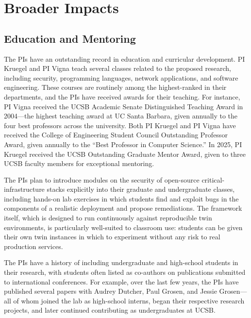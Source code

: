 \section{Broader Impacts}
\label{sec:broader}

\subsection{Education and Mentoring}

The PIs have an outstanding record in education and curricular
development. PI Kruegel and PI Vigna teach several classes related to
the proposed research, including security, programming languages,
network applications, and software engineering. These courses are
routinely among the highest-ranked in their departments, and the PIs
have received awards for their teaching. For instance, PI Vigna
received the UCSB Academic Senate Distinguished Teaching Award in
2004---the highest teaching award at UC Santa Barbara, given annually
to the four best professors across the university. Both PI Kruegel
and PI Vigna have received the College of Engineering Student Council
Outstanding Professor Award, given annually to the ``Best Professor in
Computer Science.'' In 2025, PI Kruegel received the UCSB Outstanding
Graduate Mentor Award, given to three UCSB faculty members for
exceptional mentoring.

The PIs plan to introduce modules on the security of open-source
critical-infrastructure stacks explicitly into their graduate and
undergraduate classes, including hands-on lab exercises in which
students find and exploit bugs in the components of a realistic
deployment and propose remediations. The \sysname framework itself,
which is designed to run continuously against reproducible twin
environments, is particularly well-suited to classroom use: students
can be given their own twin instances in which to experiment without
any risk to real production services.

The PIs have a history of including undergraduate and high-school
students in their research, with students often listed as co-authors
on publications submitted to international conferences. For example,
over the last few years, the PIs have published several papers with
Audrey Dutcher, Paul Grosen, and Jessie Grosen---all of whom joined
the lab as high-school interns, began their respective research
projects, and later continued contributing as undergraduates at UCSB.

